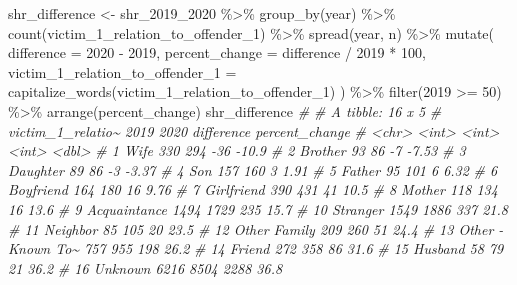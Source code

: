 \documentclass[
  a4paper,
]{krantz}
\makeatletter
\newenvironment{Shaded}{\begin{snugshade}}{\end{snugshade}}
\newcommand{\AttributeTok}[1]{\textcolor[rgb]{0.61,0.61,0.61}{#1}}
\newcommand{\CommentTok}[1]{\textcolor[rgb]{0.37,0.37,0.37}{\textit{#1}}}
\newcommand{\DecValTok}[1]{\textcolor[rgb]{0.06,0.06,0.06}{#1}}
\newcommand{\FunctionTok}[1]{\textcolor[rgb]{0,0,0}{#1}}
\newcommand{\NormalTok}[1]{#1}
\newcommand{\OtherTok}[1]{\textcolor[rgb]{0.37,0.37,0.37}{#1}}
\newcommand{\SpecialCharTok}[1]{\textcolor[rgb]{0,0,0}{#1}}
\newcommand{\StringTok}[1]{\textcolor[rgb]{0.5,0.5,0.5}{#1}}
\newenvironment{kframe}{%
\medskip{}
\setlength{\fboxsep}{.8em}
 \def\at@end@of@kframe{}%
 \ifinner\ifhmode%
  \def\at@end@of@kframe{\end{minipage}}%
  \begin{minipage}{\columnwidth}%
 \fi\fi%
 \def\FrameCommand##1{\hskip\@totalleftmargin \hskip-\fboxsep
 \colorbox{shadecolor}{##1}\hskip-\fboxsep
     \hskip-\linewidth \hskip-\@totalleftmargin \hskip\columnwidth}%
 \MakeFramed {\advance\hsize-\width
   \@totalleftmargin\z@ \linewidth\hsize
   \@setminipage}}%
 {\par\unskip\endMakeFramed%
 \at@end@of@kframe}
\renewenvironment{Shaded}{\begin{kframe}}{\end{kframe}}
\makeatother
\begin{document}
\begin{Shaded}
\begin{Highlighting}[]
\NormalTok{shr\_difference }\OtherTok{\textless{}{-}}
\NormalTok{  shr\_2019\_2020 }\SpecialCharTok{\%\textgreater{}\%}
  \FunctionTok{group\_by}\NormalTok{(year) }\SpecialCharTok{\%\textgreater{}\%}
  \FunctionTok{count}\NormalTok{(victim\_1\_relation\_to\_offender\_1) }\SpecialCharTok{\%\textgreater{}\%}
  \FunctionTok{spread}\NormalTok{(year, n) }\SpecialCharTok{\%\textgreater{}\%}
  \FunctionTok{mutate}\NormalTok{(}
    \AttributeTok{difference =} \StringTok{\textasciigrave{}}\AttributeTok{2020}\StringTok{\textasciigrave{}} \SpecialCharTok{{-}} \StringTok{\textasciigrave{}}\AttributeTok{2019}\StringTok{\textasciigrave{}}\NormalTok{,}
    \AttributeTok{percent\_change =}\NormalTok{ difference }\SpecialCharTok{/} \StringTok{\textasciigrave{}}\AttributeTok{2019}\StringTok{\textasciigrave{}} \SpecialCharTok{*} \DecValTok{100}\NormalTok{,}
    \AttributeTok{victim\_1\_relation\_to\_offender\_1 =}
      \FunctionTok{capitalize\_words}\NormalTok{(victim\_1\_relation\_to\_offender\_1)}
\NormalTok{  ) }\SpecialCharTok{\%\textgreater{}\%}
  \FunctionTok{filter}\NormalTok{(}\StringTok{\textasciigrave{}}\AttributeTok{2019}\StringTok{\textasciigrave{}} \SpecialCharTok{\textgreater{}=} \DecValTok{50}\NormalTok{) }\SpecialCharTok{\%\textgreater{}\%}
  \FunctionTok{arrange}\NormalTok{(percent\_change)}
\NormalTok{shr\_difference}
\CommentTok{\# \# A tibble: 16 x 5}
\CommentTok{\#    victim\_1\_relatio\textasciitilde{} \textasciigrave{}2019\textasciigrave{} \textasciigrave{}2020\textasciigrave{} difference percent\_change}
\CommentTok{\#    \textless{}chr\textgreater{}              \textless{}int\textgreater{}  \textless{}int\textgreater{}      \textless{}int\textgreater{}          \textless{}dbl\textgreater{}}
\CommentTok{\#  1 Wife                 330    294        {-}36         {-}10.9 }
\CommentTok{\#  2 Brother               93     86         {-}7          {-}7.53}
\CommentTok{\#  3 Daughter              89     86         {-}3          {-}3.37}
\CommentTok{\#  4 Son                  157    160          3           1.91}
\CommentTok{\#  5 Father                95    101          6           6.32}
\CommentTok{\#  6 Boyfriend            164    180         16           9.76}
\CommentTok{\#  7 Girlfriend           390    431         41          10.5 }
\CommentTok{\#  8 Mother               118    134         16          13.6 }
\CommentTok{\#  9 Acquaintance        1494   1729        235          15.7 }
\CommentTok{\# 10 Stranger            1549   1886        337          21.8 }
\CommentTok{\# 11 Neighbor              85    105         20          23.5 }
\CommentTok{\# 12 Other Family         209    260         51          24.4 }
\CommentTok{\# 13 Other {-} Known To\textasciitilde{}    757    955        198          26.2 }
\CommentTok{\# 14 Friend               272    358         86          31.6 }
\CommentTok{\# 15 Husband               58     79         21          36.2 }
\CommentTok{\# 16 Unknown             6216   8504       2288          36.8}
\end{Highlighting}
\end{Shaded}
\end{document}
